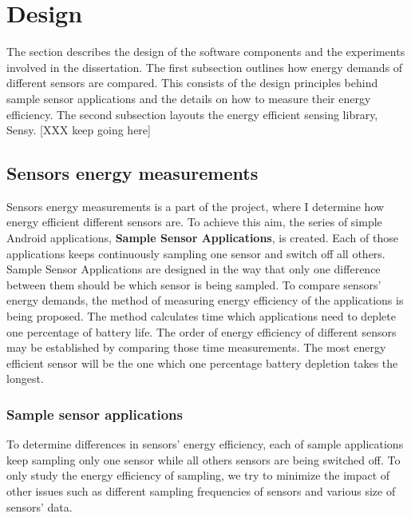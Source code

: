 \section{Design}
\label{s:design}
\hspace{10pt} The section describes the design of the software components and the experiments involved in the dissertation. The first subsection outlines how energy demands of different sensors are compared. This consists of the design principles behind sample sensor applications and the details on how to measure their energy efficiency. The second subsection layouts the energy efficient sensing library, Sensy. [XXX keep going here]

\subsection{Sensors energy measurements}
\label{s:design:measurements}
\hspace{10pt} Sensors energy measurements is a part of the project, where I determine how energy efficient different sensors are. To achieve this aim, the series of simple Android applications, \textbf{Sample Sensor Applications},  is created. Each of those applications keeps continuously sampling one sensor and switch off all others. Sample Sensor Applications are designed in the way that only one difference between them should be which sensor is being sampled. To compare sensors' energy demands, the method of measuring energy efficiency of the applications is being proposed. The method calculates time which applications need to deplete one percentage of battery life. The order of energy efficiency of different sensors may be established by comparing those time measurements. The most energy efficient sensor will be the one which one percentage battery depletion takes the longest. 

\subsubsection{Sample sensor applications}
\label{s:design:measurements:sampleapps}
\hspace{10pt} To determine differences in sensors' energy efficiency, each of sample applications keep sampling only one sensor while all others sensors are being switched off. To only study the energy efficiency of sampling, we try to minimize the impact of other issues such as different sampling frequencies of sensors and various size of sensors' data.

